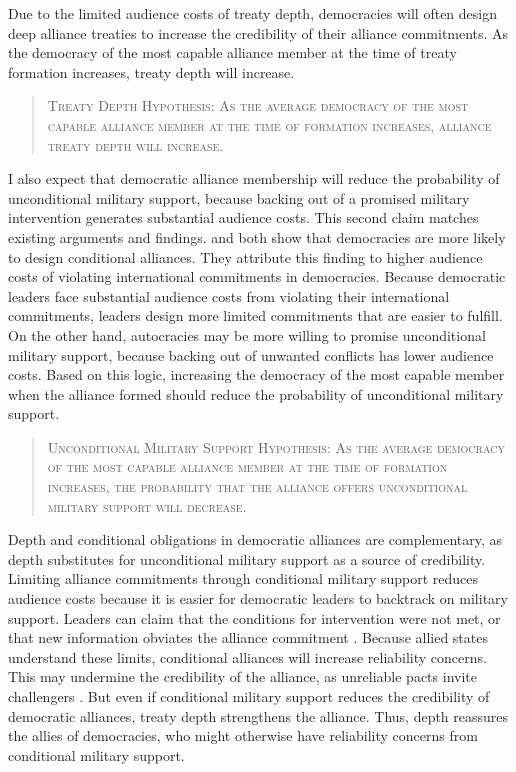 \documentclass[12pt]{article}
\begin{document}
Due to the limited audience costs of treaty depth, democracies will often design deep alliance treaties to increase the credibility of their alliance commitments. 
As the democracy of the most capable alliance member at the time of treaty formation increases, treaty depth will increase. 


\begin{quote}
\textsc{Treaty Depth Hypothesis: As the average democracy of the most capable alliance member at the time of formation increases, alliance treaty depth will increase.}
\end{quote} 


I also expect that democratic alliance membership will reduce the probability of unconditional military support, because backing out of a promised military intervention generates substantial audience costs. 
This second claim matches existing arguments and findings. 
\citet{Mattes2012} and \citet{Chibaetal2015} both show that democracies are more likely to design conditional alliances. 
They attribute this finding to higher audience costs of violating international commitments in democracies. 
Because democratic leaders face substantial audience costs from violating their international commitments, leaders design more limited commitments that are easier to fulfill. 
On the other hand, autocracies may be more willing to promise unconditional military support, because backing out of unwanted conflicts has lower audience costs. 
Based on this logic, increasing the democracy of the most capable member when the alliance formed should reduce the probability of unconditional military support.


\begin{quote}
\textsc{Unconditional Military Support Hypothesis: As the average democracy of the most capable alliance member at the time of formation increases, the probability that the alliance offers unconditional military support will decrease.}
\end{quote} 


Depth and conditional obligations in democratic alliances are complementary, as depth substitutes for unconditional military support as a source of credibility. 
Limiting alliance commitments through conditional military support reduces audience costs because it is easier for democratic leaders to backtrack on military support. 
Leaders can claim that the conditions for intervention were not met, or that new information obviates the alliance commitment \citep{LevenduskyHorowitz2012}. 
Because allied states understand these limits, conditional alliances will increase reliability concerns. 
This may undermine the credibility of the alliance, as unreliable pacts invite challengers \citep{Smith1995}. 
But even if conditional military support reduces the credibility of democratic alliances, treaty depth strengthens the alliance. 
Thus, depth reassures the allies of democracies, who might otherwise have reliability concerns from conditional military support. 
\end{document}
